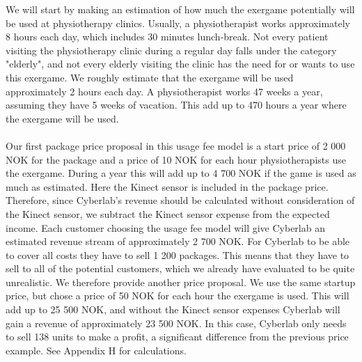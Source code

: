 We will start by making an estimation of how much the exergame potentially will be used at physiotherapy clinics. Usually, a physiotherapist works approximately 8 hours each day, which includes 30 minutes lunch-break. Not every patient visiting the physiotherapy clinic during a regular day falls under the category "elderly", and not every elderly visiting the clinic has the need for or wants to use this exergame. We roughly estimate that the exergame will be used approximately 2 hours each day. A physiotherapist works 47 weeks a year, assuming they have 5 weeks of vacation. This add up to 470 hours a year where the exergame will be used.\\ \\
Our first package price proposal in this usage fee model is a start price of 2 000 NOK for the package and a price of 10 NOK for each hour physiotherapists use the exergame. During a year this will add up to 4 700 NOK if the game is used as much as estimated. Here the Kinect sensor is included in the package price. Therefore, since Cyberlab’s revenue should be calculated without consideration of the Kinect sensor, we subtract the Kinect sensor expense from the expected income. Each customer choosing the usage fee model will give Cyberlab an estimated revenue stream of approximately 2 700 NOK. For Cyberlab to be able to cover all costs they have to sell 1 200 packages. This means that they have to sell to all of the potential customers, which we already have evaluated to be quite unrealistic. We therefore provide another price proposal. We use the same startup price, but chose a price of 50 NOK for each hour the exergame is used. This will add up to 25 500 NOK, and without the Kinect sensor expenses Cyberlab will gain a revenue of approximately 23 500 NOK. In this case, Cyberlab only needs to sell 138 units to make a profit, a significant difference from the previous price example. See Appendix H for calculations. \\ \\


